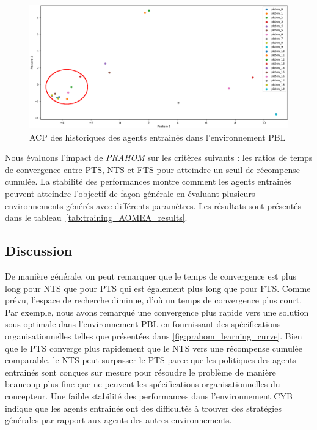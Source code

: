 \documentclass[contribution]{jfsma}
\begin{document}
\begin{figure}[h!]
  \centering
  \includegraphics[width=\linewidth]{figures/prahom_pca_analysis.png}
  \caption{ACP des historiques des agents entrainés dans l'environnement PBL}
  \label{fig:prahom_pca_analysis}
\end{figure}

Nous évaluons l'impact de \emph{PRAHOM} sur les critères suivants : les ratios de temps de convergence entre PTS, NTS et FTS pour atteindre un seuil de récompense cumulée. La stabilité des performances montre comment les agents entrainés peuvent atteindre l'objectif de façon générale en évaluant plusieurs environnements générés avec différents paramètres. Les résultats sont présentés dans le tableau~\ref{tab:training_AOMEA_results}.
%


\subsection{Discussion}

De manière générale, on peut remarquer que le temps de convergence est plus long pour NTS que pour PTS qui est également plus long que pour FTS. Comme prévu, l’espace de recherche diminue, d’où un temps de convergence plus court. Par exemple, nous avons remarqué une convergence plus rapide vers une solution sous-optimale dans l’environnement PBL en fournissant des spécifications organisationnelles telles que présentées dans \autoref{fig:prahom_learning_curve}. Bien que le PTS converge plus rapidement que le NTS vers une récompense cumulée comparable, le NTS peut surpasser le PTS parce que les politiques des agents entrainés sont conçues sur mesure pour résoudre le problème de manière beaucoup plus fine que ne peuvent les spécifications organisationnelles du concepteur. Une faible stabilité des performances dans l'environnement CYB indique que les agents entrainés ont des difficultés à trouver des stratégies générales par rapport aux agents des autres environnements.
\end{document}
